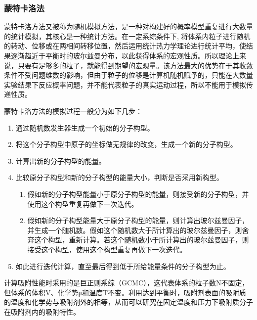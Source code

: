 \subsubsection{蒙特卡洛法}
\par{蒙特卡洛方法又被称为随机模拟方法，是一种对构建好的概率模型重复进行大数量的统计模拟，其核心是一种统计方法。在一定系综条件下, 将体系内粒子进行随机的转动、位移或在两相间转移位置，然后运用统计热力学理论进行统计平均，使结果逐渐趋近于平衡时的玻尔兹曼分布，以此获得体系的宏观性质。所以理论上来说，只要有足够多的粒子，就能得到期望的宏观量。该方法最大的优势在于其收敛条件不受问题维数的影响，但由于粒子的位移是计算机随机赋予的，只能在大数量实验结果下反应概率问题，并不能代表粒子的真实运动过程，所以不能用于模拟传递性质\cite{分子模拟技术在石油相关领域的应用}。}
\par{蒙特卡洛方法的模拟过程一般分为如下几步\cite{分子模拟的理论与实践}：}
\begin{enumerate}
    \item 通过随机数发生器生成一个初始的分子构型。
    \item 将这个分子构型中原子的坐标做无规律的改变，生成一个新的分子构型。
    \item 计算出新的分子构型的能量。
    \item 比较原分子构型和新的分子构型的能量大小，判断是否采用新构型。
    \begin{enumerate}[label=（\alph*）,leftmargin=2em]
        \item 假如新的分子构型能量小于原分子构型的能量，则接受新的分子构型，并使用这个构型重复再做下一次迭代。
        \item 假如新的分子构型能量大于原分子构型的能量，则计算出玻尔兹曼因子，并生成一个随机数。假如这个随机数大于所计算出的玻尔兹曼因子，则舍弃这个构型，重新计算。若这个随机数小于所计算出的玻尔兹曼因子，则接受这个构型，使用这个构型重复再做下一次迭代。
    \end{enumerate}
    \item 如此进行迭代计算，直至最后得到低于所给能量条件的分子构型为止。
\end{enumerate}
\par{计算吸附性能时采用的是巨正则系综（GCMC），这代表体系的粒子数N不固定，但体系的体积V、化学势μ和温度T不变。利用达到平衡时，吸附剂表面的吸附质的温度和化学势与吸附剂外的相等，从而可以研究在固定温度和压力下吸附质分子在吸附剂内的吸附特性。}
